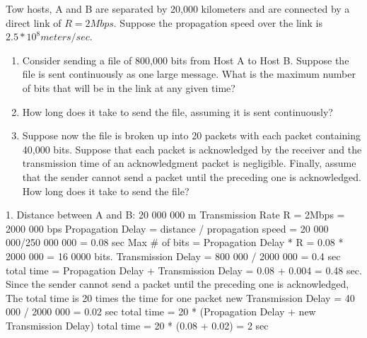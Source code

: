 \documentclass{report}
\begin{document}
\begin{problem}
Tow hosts, A and B are separated by 20,000 kilometers and are connected by a direct link of $R=2Mbps$. Suppose the propagation speed over the link is $2.5*10^{8} meters/sec$.

\begin{enumerate}
\item Consider sending a file of 800,000 bits from Host A to Host B. Suppose the file is sent continuously as one large message. What is the maximum number of bits that will be in the link at any given time?
\item How long does it take to send the file, assuming it is sent continuously?
\item Suppose now the file is broken up into 20 packets with each packet containing 40,000 bits. Suppose that each packet is acknowledged by the receiver and the transmission time of an acknowledgment packet is negligible. Finally, assume that the sender cannot send a packet until the preceding one is acknowledged. How long does it take to send the file?
\end{enumerate}

    \begin{answer}{30em}
    1. Distance between A and B: 20 000 000 m\newline
    Transmission Rate R = 2Mbps = 2000 000 bps\newline
    Propagation Delay = distance / propagation speed = 20 000 000/250 000 000 = 0.08 sec\newline
    Max # of bits = Propagation Delay * R = 0.08 * 2000 000 = 16 0000 bits\newline {}. Transmission Delay = 800 000 / 2000 000 = 0.4 sec\newline
    total time = Propagation Delay + Transmission Delay = 0.08 + 0.004 = 0.48 sec\newline{}. Since the sender cannot send a packet until the preceding one is acknowledged,\newline
    The total time is 20 times the time for one packet\newline
    new Transmission Delay = 40 000 / 2000 000 = 0.02 sec\newline
    total time = 20 * (Propagation Delay + new Transmission Delay)\newline
    total time = 20 * (0.08 + 0.02) = 2 sec\newline
    \end{answer}

\end{problem}
\end{document}
